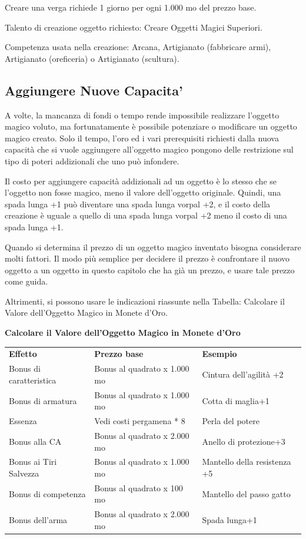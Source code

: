 \documentclass[a4paper,11pt,twoside,openany]{book}
\begin{document}
Creare una verga richiede 1 giorno per ogni 1.000 mo del prezzo base.

Talento di creazione oggetto richiesto: Creare Oggetti Magici Superiori.

Competenza usata nella creazione: Arcana, Artigianato (fabbricare armi), Artigianato (oreficeria) o Artigianato (scultura).

\subsection{Aggiungere Nuove Capacita'}

A volte, la mancanza di fondi o tempo rende impossibile realizzare l'oggetto magico voluto, ma fortunatamente è possibile potenziare o modificare un oggetto magico creato. Solo il tempo, l'oro ed i vari prerequisiti richiesti dalla nuova capacità che si vuole aggiungere all'oggetto magico pongono delle restrizione sul tipo di poteri addizionali che uno può infondere.

Il costo per aggiungere capacità addizionali ad un oggetto è lo stesso che se l'oggetto non fosse magico, meno il valore dell'oggetto originale. Quindi, una spada lunga +1 può diventare una spada lunga vorpal +2, e il costo della creazione è uguale a quello di una spada lunga vorpal +2 meno il costo di una spada lunga +1.

Quando si determina il prezzo di un oggetto magico inventato bisogna considerare molti fattori. Il modo più semplice per decidere il prezzo è confrontare il nuovo oggetto a un oggetto in questo capitolo che ha già un prezzo, e usare tale prezzo come guida.

Altrimenti, si possono usare le indicazioni riassunte nella Tabella: Calcolare il Valore dell'Oggetto Magico in Monete d'Oro.

\bigskip

\textbf{Calcolare il Valore dell'Oggetto Magico in Monete d'Oro}

\begin{tabular}{lll}
	\toprule
	\textbf{Effetto}        & \textbf{Prezzo base}         & \textbf{Esempio}\\
	Bonus di caratteristica & Bonus al quadrato x 1.000 mo & Cintura dell'agilità +2\\
	Bonus di armatura       & Bonus al quadrato x 1.000 mo & Cotta di maglia+1\\
	Essenza                 & Vedi costi pergamena {*} 8   & Perla del potere\\
	Bonus alla CA           & Bonus al quadrato x 2.000 mo & Anello di protezione+3\\
	Bonus ai Tiri Salvezza  & Bonus al quadrato x 1.000 mo & Mantello della resistenza +5\\
	Bonus di competenza     & Bonus al quadrato x 100 mo   & Mantello del passo gatto\\
	Bonus dell'arma         & Bonus al quadrato x 2.000 mo & Spada lunga+1\\
\end{tabular}
\end{document}
